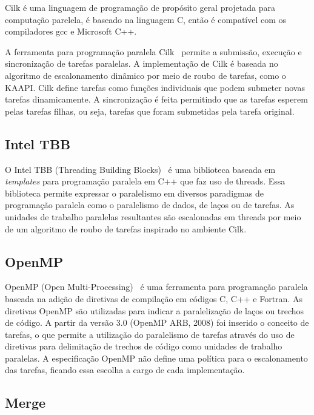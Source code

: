 Cilk é uma linguagem de programação de propósito geral projetada para computação parelela, é baseado na linguagem C, então é compatível com os compiladores gcc e Microsoft C++.

A ferramenta para programação paralela Cilk~\citep{Blumofe:1995:CEM:209936.209958, Blumofe:1997:ARP:1268680.1268690} permite a submissão, execução e sincronização de tarefas paralelas. A implementação de Cilk é baseada no algoritmo de escalonamento dinâmico por meio de roubo de tarefas, como o KAAPI. Cilk define tarefas como funções individuais que podem submeter novas tarefas dinamicamente. A sincronização é feita permitindo que as tarefas esperem pelas tarefas filhas, ou seja, tarefas que foram submetidas pela tarefa original.


\subsection{Intel TBB}

O Intel TBB (Threading Building Blocks)~\citep{Kim:2011:MDP:1920042.1920078} é uma biblioteca baseada em \emph{templates} para programação paralela em C++ que faz uso de threads. Essa biblioteca permite expressar o paralelismo em diversos paradigmas de programação paralela como o paralelismo de dados, de laços ou de tarefas. As unidades de trabalho paralelas resultantes são escalonadas em threads por meio de um algoritmo de roubo de tarefas inspirado no ambiente Cilk.

\subsection{OpenMP}

OpenMP (Open Multi-Processing)~\citep{Quinn:2003:PPC:1211440} é uma ferramenta para programação paralela baseada na adição de diretivas de compilação em códigos C, C++ e Fortran. As diretivas OpenMP são utilizadas para indicar a paralelização de laços ou trechos de código. A partir da versão 3.0 (OpenMP ARB, 2008) foi inserido o conceito de tarefas, o que permite a utilização do paralelismo de tarefas através do uso de diretivas para delimitação de trechos de código como unidades de trabalho paralelas. A especificação OpenMP não define uma política para o escalonamento das tarefas, ficando essa escolha a cargo de cada implementação.


\subsection{Merge}

